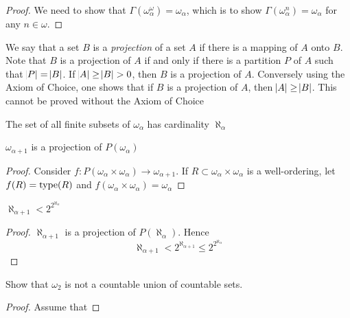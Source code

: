 \documentclass[11pt]{article}
\begin{document}
\begin{proof}
We need to show that \(\Gamma(\omega_\alpha^\omega)=\omega_\alpha\), which is
to show \(\Gamma(\omega_\alpha^n)=\omega_\alpha\) for any \(n\in\omega\).
\end{proof}

We say that a set \(B\) is a \emph{projection} of a set \(A\) if there is a mapping of
\(A\) onto \(B\). Note that \(B\) is a projection of \(A\) if and only if there is a
partition \(P\) of \(A\) such that \(\abs{P}=\abs{B}\). If \(\abs{A}\ge\abs{B}>0\),
then \(B\) is a projection of \(A\). Conversely using the Axiom of Choice, one
shows that if \(B\) is a projection of \(A\), then \(\abs{A}\ge\abs{B}\). This
cannot be proved without the Axiom of Choice

\begin{exercise}
The set of all finite subsets of \(\omega_\alpha\) has cardinality \(\aleph_\alpha\)
\end{exercise}

\begin{exercise}
\(\omega_{\alpha+1}\) is a projection of \(P(\omega_\alpha)\)
\end{exercise}
\begin{proof}
Consider \(f:P(\omega_\alpha\times\omega_\alpha)\to\omega_{\alpha+1}\). If
\(R\subset\omega_\alpha\times\omega_\alpha\) is a well-ordering, let
\(f(R)=\operatorname{type}(R)\) and \(f(\omega_\alpha\times\omega_\alpha)=\omega_\alpha\)
\end{proof}
\begin{exercise}
\(\aleph_{\alpha+1}<2^{2^{\aleph_\alpha}}\)
\end{exercise}
\begin{proof}
\(\aleph_{\alpha+1}\) is a projection of \(P(\aleph_\alpha)\). Hence
\begin{equation*}
\aleph_{\alpha+1}<2^{\aleph_{\alpha+1}}\le 2^{2^{\aleph_\alpha}}
\end{equation*}
\end{proof}
\begin{exercise}[$\zf$]
Show that \(\omega_2\) is not a countable union of countable sets.
\end{exercise}
\begin{proof}
Assume that
\end{proof}
\end{document}
